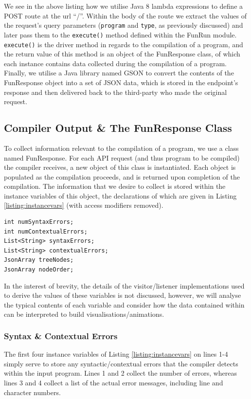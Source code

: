 \documentclass{l4proj}
\begin{document}
We see in the above listing how we utilise Java 8 lambda expressions to define a POST route at the url ``/''. Within the body of the route we extract the values of the request's query parameters (\texttt{program} and \texttt{type}, as previously discussed) and later pass them to the \texttt{execute()} method defined within the FunRun module. \texttt{execute()} is the driver method in regards to the compilation of a program, and the return value of this method is an object of the FunResponse class, of which each instance contains data collected during the compilation of a program. Finally, we utilise a Java library named GSON to convert the contents of the FunResponse object into a set of JSON data, which is stored in the endpoint's response and then delivered back to the third-party who made the original request.

\subsection{Compiler Output \& The FunResponse Class}
To collect information relevant to the compilation of a program, we use a class named FunResponse. For each API request (and thus program to be compiled) the compiler receives, a new object of this class is instantiated. Each object is populated as the compilation proceeds, and is returned upon completion of the compilation. The information that we desire to collect is stored within the instance variables of this object, the declarations of which are given in Listing \ref{listing:instancevars} (with access modifiers removed).
\begin{lstlisting}[language=myjava, caption=FunResponse instance variables, label=listing:instancevars]
int numSyntaxErrors;
int numContextualErrors;
List<String> syntaxErrors;
List<String> contextualErrors;
JsonArray treeNodes;
JsonArray nodeOrder;
\end{lstlisting}

In the interest of brevity, the details of the visitor/listener implementations used to derive the values of these variables is not discussed, however, we will analyse the typical contents of each variable and consider how the data contained within can be interpreted to build visualisations/animations.

\subsubsection{Syntax \& Contextual Errors}
The first four instance variables of Listing \ref{listing:instancevars} on lines 1-4 simply serve to store any syntactic/contextual errors that the compiler detects within the input program. Lines 1 and 2 collect the number of errors, whereas lines 3 and 4 collect a list of the actual error messages, including line and character numbers.
\end{document}
